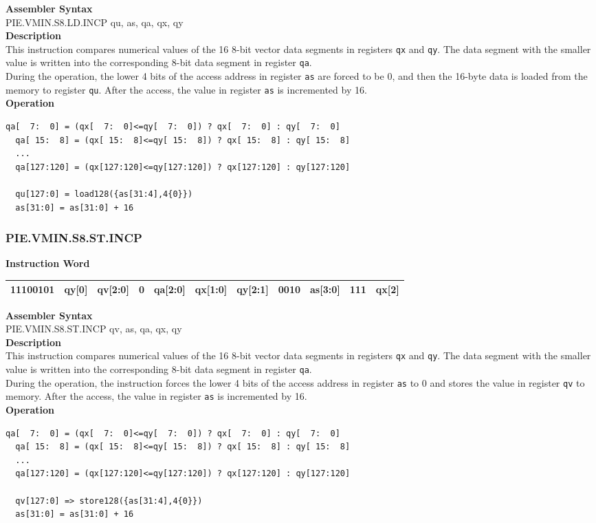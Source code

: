 \textbf{Assembler Syntax} \\
PIE.VMIN.S8.LD.INCP qu, as, qa, qx, qy \\
\textbf{Description} \\
This instruction compares numerical values of the 16 8-bit vector data segments in registers \lstinline{qx} and \lstinline{qy}. The data segment with the smaller value is written into the corresponding 8-bit data segment in register \lstinline{qa}.\\
During the operation, the lower 4 bits of the access address in register \lstinline{as} are forced to be 0, and then the 16-byte data is loaded from the memory to register \lstinline{qu}. After the access, the value in register \lstinline{as} is incremented by 16.\\
\textbf{Operation}
\begin{lstlisting}[escapeinside=`?]
  qa[  7:  0] = (qx[  7:  0]<=qy[  7:  0]) ? qx[  7:  0] : qy[  7:  0]
  qa[ 15:  8] = (qx[ 15:  8]<=qy[ 15:  8]) ? qx[ 15:  8] : qy[ 15:  8]
  ...
  qa[127:120] = (qx[127:120]<=qy[127:120]) ? qx[127:120] : qy[127:120]

  qu[127:0] = load128({as[31:4],4{0}})
  as[31:0] = as[31:0] + 16
\end{lstlisting}

\newpage
\subsubsection{PIE.VMIN.S8.ST.INCP}\label{instruction:PIEVMINS8STINCP}
\setlength\tabcolsep{6pt}
\textbf{Instruction Word} \\
\begin{tabular}{|c|c|c|c|c|c|c|c|c|c|c|}
	\hline
	11100101 & qy[0] & qv[2:0] & 0 & qa[2:0] & qx[1:0] & qy[2:1] & 0010 & as[3:0] & 111 & qx[2] \\
	\hline
\end{tabular}

\textbf{Assembler Syntax} \\
PIE.VMIN.S8.ST.INCP qv, as, qa, qx, qy \\
\textbf{Description} \\
This instruction compares numerical values of the 16 8-bit vector data segments in registers \lstinline{qx} and \lstinline{qy}. The data segment with the smaller value is written into the corresponding 8-bit data segment in register \lstinline{qa}.\\
During the operation, the instruction forces the lower 4 bits of the access address in register \lstinline{as} to 0 and stores the value in register \lstinline{qv} to memory. After the access, the value in register \lstinline{as} is incremented by 16.\\
\textbf{Operation}
\begin{lstlisting}[escapeinside=`?]
  qa[  7:  0] = (qx[  7:  0]<=qy[  7:  0]) ? qx[  7:  0] : qy[  7:  0]
  qa[ 15:  8] = (qx[ 15:  8]<=qy[ 15:  8]) ? qx[ 15:  8] : qy[ 15:  8]
  ...
  qa[127:120] = (qx[127:120]<=qy[127:120]) ? qx[127:120] : qy[127:120]

  qv[127:0] => store128({as[31:4],4{0}})
  as[31:0] = as[31:0] + 16
\end{lstlisting}

